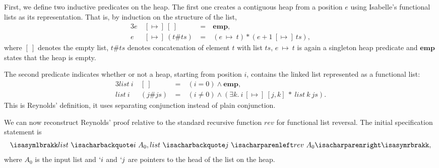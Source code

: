 \documentclass[twoside,runningheads,envcountsame,envcountsect,oribibl,orivec]{llncs}
\newcommand{\eemp}{\mathbf{emp}}
\newcommand{\emptylist}{[~]}
\newcommand{\mapslist}{\ [\mapsto]\ }
\newcommand{\spec}[2]{{\isasymlbrakk}#1, #2{\isasymrbrakk}}
\begin{document}
First, we define two inductive predicates on the heap.  The first one
creates a contiguous heap from a position $e$ using Isabelle's
functional lists as its representation. That is, by induction on the
structure of the list,
\begin{alignat*}{3}
	e &\mapslist \emptylist \ &=& \ \eemp, \\
	e &\mapslist (t\#ts) \ &=& \ (e\ \mapsto\ t) \ast (e + 1 \mapslist ts),
\end{alignat*}
where $\emptylist$ denotes the empty list, $t\#ts$ denotes
concatenation of element $t$ with list $ts$, $e\ \mapsto\ t$ is again
a singleton heap predicate and $\eemp$ states that the heap is empty.

The second predicate indicates whether or not a heap, starting from position $i$,
contains the linked list represented as a functional list:
\begin{alignat*}{3}
	list\ i\ &\emptylist \ & =&\  (i = 0) \wedge \eemp, \\
	list\ i\ &(j\#js) \ &=& \  (i \neq 0) \wedge (\exists k.\ i \mapslist [j,k]\ \ast\ list\ k\ js).
\end{alignat*}
This is  Reynolds' definition, it uses separating conjunction
instead of plain conjunction.

We can now reconstruct Reynolds' proof relative to the standard
recursive function $\mathit{rev}$ for functional list reversal. The
initial specification statement is
\begin{equation*}
\spec{list\ {\isacharbackquote}i\ A_0}
	{list\ {\isacharbackquote}j\ {\isacharparenleft}rev\ A_0{\isacharparenright}},
\end{equation*}
where $A_0$ is the input list and $`i$ and $`j$ are pointers to the head of the list
on the heap.
\end{document}
